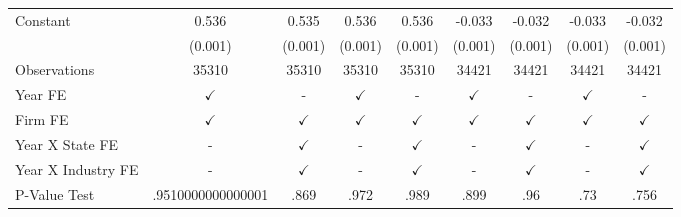 {\begin{tabular}{l*{8}{c}}
Constant            &       0.536\sym{***}&       0.535\sym{***}&       0.536\sym{***}&       0.536\sym{***}&      -0.033\sym{***}&      -0.032\sym{***}&      -0.033\sym{***}&      -0.032\sym{***}\\
                    &     (0.001)         &     (0.001)         &     (0.001)         &     (0.001)         &     (0.001)         &     (0.001)         &     (0.001)         &     (0.001)         \\
\midrule
Observations        &       35310         &       35310         &       35310         &       35310         &       34421         &       34421         &       34421         &       34421         \\
Year FE             &$\checkmark$         &           -         &$\checkmark$         &           -         &$\checkmark$         &           -         &$\checkmark$         &           -         \\
Firm FE             &$\checkmark$         &$\checkmark$         &$\checkmark$         &$\checkmark$         &$\checkmark$         &$\checkmark$         &$\checkmark$         &$\checkmark$         \\
Year X State FE     &           -         &$\checkmark$         &           -         &$\checkmark$         &           -         &$\checkmark$         &           -         &$\checkmark$         \\
Year X Industry FE  &           -         &$\checkmark$         &           -         &$\checkmark$         &           -         &$\checkmark$         &           -         &$\checkmark$         \\
P-Value Test        &.9510000000000001         &        .869         &        .972         &        .989         &        .899         &         .96         &         .73         &        .756         \\
\bottomrule
\end{tabular}
}
